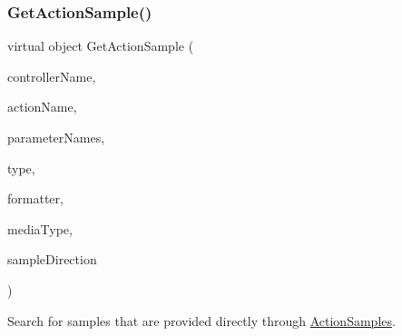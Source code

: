 \mbox{\label{classApi3Layers_1_1Areas_1_1HelpPage_1_1HelpPageSampleGenerator_afc3c226b317421515e9e9b457b42f0f5}} 
\subsubsection{\texorpdfstring{Get\+Action\+Sample()}{GetActionSample()}}
{\footnotesize\ttfamily virtual object Get\+Action\+Sample (\begin{DoxyParamCaption}\item[{string}]{controller\+Name,  }\item[{string}]{action\+Name,  }\item[{I\+Enumerable$<$ string $>$}]{parameter\+Names,  }\item[{Type}]{type,  }\item[{Media\+Type\+Formatter}]{formatter,  }\item[{Media\+Type\+Header\+Value}]{media\+Type,  }\item[{\hyperlink{namespaceApi3Layers_1_1Areas_1_1HelpPage_abad9f6d2b059d72558bf70415efc32b5}{Sample\+Direction}}]{sample\+Direction }\end{DoxyParamCaption})\hspace{0.3cm}{\ttfamily [virtual]}}



Search for samples that are provided directly through \hyperlink{classApi3Layers_1_1Areas_1_1HelpPage_1_1HelpPageSampleGenerator_aa710c187ca87cf2194303931e56088f5}{Action\+Samples}. 


